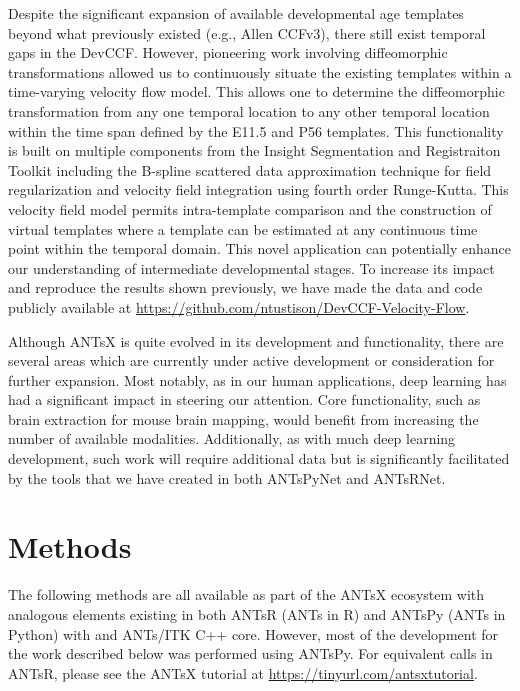 \documentclass[
  12pt,
]{article}
\begin{document}
Despite the significant expansion of available developmental age
templates beyond what previously existed (e.g., Allen CCFv3), there
still exist temporal gaps in the DevCCF. However, pioneering work
involving diffeomorphic transformations allowed us to continuously
situate the existing templates within a time-varying velocity flow
model. This allows one to determine the diffeomorphic transformation
from any one temporal location to any other temporal location within the
time span defined by the E11.5 and P56 templates. This functionality is
built on multiple components from the Insight Segmentation and
Registraiton Toolkit including the B-spline scattered data approximation
technique for field regularization and velocity field integration using
fourth order Runge-Kutta. This velocity field model permits
intra-template comparison and the construction of virtual templates
where a template can be estimated at any continuous time point within
the temporal domain. This novel application can potentially enhance our
understanding of intermediate developmental stages. To increase its
impact and reproduce the results shown previously, we have made the data
and code publicly available at
\url{https://github.com/ntustison/DevCCF-Velocity-Flow}.

Although ANTsX is quite evolved in its development and functionality,
there are several areas which are currently under active development or
consideration for further expansion. Most notably, as in our human
applications, deep learning has had a significant impact in steering our
attention. Core functionality, such as brain extraction for mouse brain
mapping, would benefit from increasing the number of available
modalities. Additionally, as with much deep learning development, such
work will require additional data but is significantly facilitated by
the tools that we have created in both ANTsPyNet and ANTsRNet.

\clearpage
\newpage

\hypertarget{methods}{%
\section*{Methods}\label{methods}}

The following methods are all available as part of the ANTsX ecosystem
with analogous elements existing in both ANTsR (ANTs in R) and ANTsPy
(ANTs in Python) with and ANTs/ITK C++ core. However, most of the
development for the work described below was performed using ANTsPy. For
equivalent calls in ANTsR, please see the ANTsX tutorial at
\url{https://tinyurl.com/antsxtutorial}.
\end{document}
